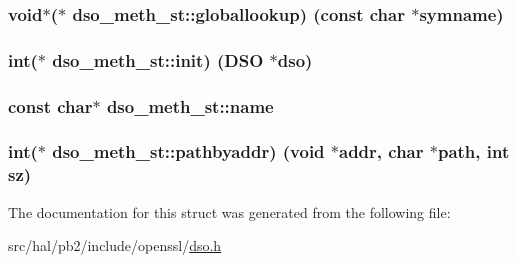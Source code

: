 \subsubsection[{\texorpdfstring{globallookup}{globallookup}}]{\setlength{\rightskip}{0pt plus 5cm}void$\ast$($\ast$ dso\+\_\+meth\+\_\+st\+::globallookup) (const char $\ast$symname)}\hypertarget{structdso__meth__st_a3aa2a99cee5689fdd4800498f4d791b6}{}\label{structdso__meth__st_a3aa2a99cee5689fdd4800498f4d791b6}
\subsubsection[{\texorpdfstring{init}{init}}]{\setlength{\rightskip}{0pt plus 5cm}int($\ast$ dso\+\_\+meth\+\_\+st\+::init) ({\bf D\+SO} $\ast$dso)}\hypertarget{structdso__meth__st_af88ab1073bac7849a6b23a0cb7df4872}{}\label{structdso__meth__st_af88ab1073bac7849a6b23a0cb7df4872}
\subsubsection[{\texorpdfstring{name}{name}}]{\setlength{\rightskip}{0pt plus 5cm}const char$\ast$ dso\+\_\+meth\+\_\+st\+::name}\hypertarget{structdso__meth__st_aef9c2213572b32054a97a99954505d6e}{}\label{structdso__meth__st_aef9c2213572b32054a97a99954505d6e}
\subsubsection[{\texorpdfstring{pathbyaddr}{pathbyaddr}}]{\setlength{\rightskip}{0pt plus 5cm}int($\ast$ dso\+\_\+meth\+\_\+st\+::pathbyaddr) (void $\ast$addr, char $\ast$path, int sz)}\hypertarget{structdso__meth__st_ae05dbf002bd9bf1d78d1ca833f225e4b}{}\label{structdso__meth__st_ae05dbf002bd9bf1d78d1ca833f225e4b}


The documentation for this struct was generated from the following file\+:\begin{DoxyCompactItemize}
\item 
src/hal/pb2/include/openssl/\hyperlink{dso_8h}{dso.\+h}\end{DoxyCompactItemize}
